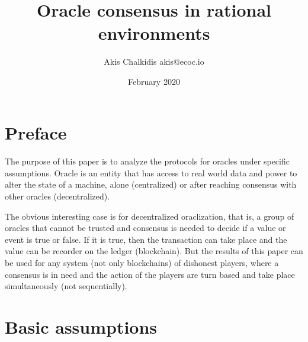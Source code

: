 \documentclass{article}
\title{Oracle consensus in rational environments}
\author{Akis Chalkidis  akis@ecoc.io}
\date{February 2020}
\begin{document}
\pagecolor{lightyellow}
\maketitle
\tableofcontents
\newpage

\section{Preface}
\paragraph{ }
	The purpose of this paper is to analyze the protocols for oracles under specific assumptions. Oracle is an entity that has access to real world data and power to alter the state of a machine, alone (centralized) or after reaching consensus with other oracles (decentralized).\par
	The obvious interesting case is for decentralized oraclization, that is, a group of oracles that cannot be trusted and consensus is needed to decide if a value or event is true or false. If it is true, then the transaction can take place and the value can be recorder on the ledger (blockchain). But the results of this paper can be used for any system (not only blockchains) of dishonest players, where a consensus is in need and the action of the players are turn based and take place simultaneously (not sequentially).
	
\section{Basic assumptions}
\end{document}
